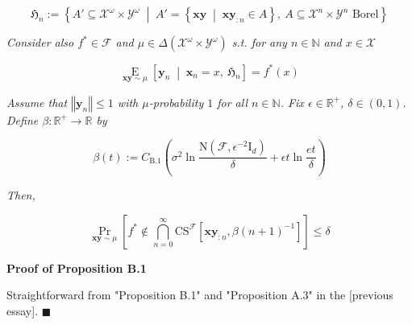 \documentclass[a4paper]{article}
\newcommand{\Co}[1]{}
\newcommand{\San}[1]{}
\newcommand{\AP}[1]{\left(#1\right)}
\newcommand{\AB}[1]{\left[#1\right]}
\newcommand{\ABM}[2]{\left[#1\;\middle\vert\;#2\right]}
\newcommand{\ACM}[2]{\left\{#1\;\middle\vert\;#2\right\}}
\newcommand{\Norm}[1]{\left\Vert #1 \right\Vert}
\newcommand{\Pa}[2]{\underset{#1}{\operatorname{Pr}}\AB{#2}}
\newcommand{\CE}[3]{\underset{#1}{\operatorname{E}}\ABM{#2}{#3}}
\newcommand{\Nats}{\mathbb{N}}
\newcommand{\Reals}{\mathbb{R}}
\newcommand{\Id}{\mathrm{I}}
\newcommand{\X}{\mathcal{X}}
\newcommand{\Y}{\mathcal{Y}}
\newcommand{\F}{\mathcal{F}}
\newcommand{\N}{\mathrm{N}}
\newcommand{\CS}{\mathrm{CS}}
\begin{document}
$$\mathfrak{H}_n:=\ACM{A'\subseteq\X^\omega\times\Y^\omega}{A'=\ACM{\boldsymbol{xy}}{\boldsymbol{xy}_{:n}\in A},\ A\subseteq\X^n\times\Y^n\text{ Borel}}$$

\textit{Consider also $f^*\in\F$ and $\mu\in\Delta\AP{\X^\omega\times\Y^\omega}$ s.t. for any $n\in\Nats$ and $x\in\X$}\Co{i}

$$\CE{\boldsymbol{xy}\sim\mu}{\boldsymbol{y}_n}{\boldsymbol{x}_n=x,\ \mathfrak{H}_n} = f^*(x)$$

\textit{Assume that $\Norm{\boldsymbol{y}_n}\leq1$ with $\mu$-probability $1$ for all $n\in\Nats$. Fix $\epsilon\in\Reals^+$, $\delta\in(0,1)$. Define $\beta:\Reals^+\rightarrow\Reals$ by}\Co{i}

$$\beta(t):=C_{\mathrm{B.1}}\AP{\sigma^2 \ln{\frac{\N\AP{\F,\epsilon^{-2}\Id_d}}{\delta}}+\epsilon t\ln{\frac{et}{\delta}}}$$

\textit{Then,}\Co{i}

$$\Pa{\boldsymbol{xy}\sim\mu}{f^*\not\in\bigcap_{n=0}^\infty\CS^\F\AB{\boldsymbol{xy}_{:n},\beta(n+1)^{-1}}} \leq \delta$$

\textbf{Proof of Proposition B.1}\Co{b}

Straightforward from "Proposition B.1" and "Proposition A.3" in the [previous essay]\San{(https://www.alignmentforum.org/posts/Qa5jG9z9dC6E4s9JH/dimensional-regret-without-resets)}. $\blacksquare$
\end{document}
